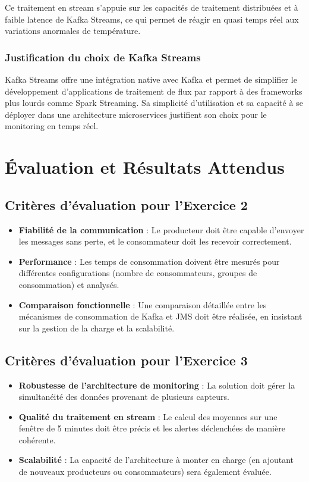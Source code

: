 Ce traitement en stream s’appuie sur les capacités de traitement distribuées et à faible latence de Kafka Streams, ce qui permet de réagir en quasi temps réel aux variations anormales de température.

\subsubsection{Justification du choix de Kafka Streams}
Kafka Streams offre une intégration native avec Kafka et permet de simplifier le développement d’applications de traitement de flux par rapport à des frameworks plus lourds comme Spark Streaming. Sa simplicité d’utilisation et sa capacité à se déployer dans une architecture microservices justifient son choix pour le monitoring en temps réel.


\section{Évaluation et Résultats Attendus}

\subsection{Critères d’évaluation pour l’Exercice 2}

\begin{itemize}
    \item \textbf{Fiabilité de la communication} : Le producteur doit être capable d’envoyer les messages sans perte, et le consommateur doit les recevoir correctement.
    \item \textbf{Performance} : Les temps de consommation doivent être mesurés pour différentes configurations (nombre de consommateurs, groupes de consommation) et analysés.
    \item \textbf{Comparaison fonctionnelle} : Une comparaison détaillée entre les mécanismes de consommation de Kafka et JMS doit être réalisée, en insistant sur la gestion de la charge et la scalabilité.
\end{itemize}

\subsection{Critères d’évaluation pour l’Exercice 3}

\begin{itemize}
    \item \textbf{Robustesse de l’architecture de monitoring} : La solution doit gérer la simultanéité des données provenant de plusieurs capteurs.
    \item \textbf{Qualité du traitement en stream} : Le calcul des moyennes sur une fenêtre de 5 minutes doit être précis et les alertes déclenchées de manière cohérente.
    \item \textbf{Scalabilité} : La capacité de l’architecture à monter en charge (en ajoutant de nouveaux producteurs ou consommateurs) sera également évaluée.
\end{itemize}


